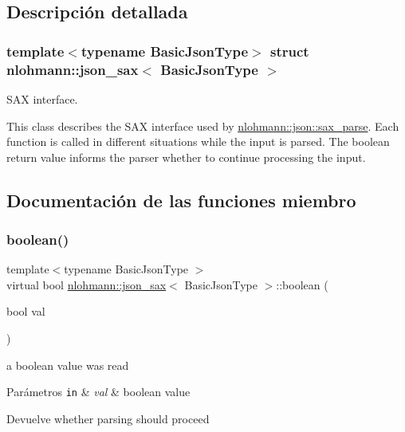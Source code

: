 \subsection{Descripción detallada}
\subsubsection*{template$<$typename Basic\+Json\+Type$>$\newline
struct nlohmann\+::json\+\_\+sax$<$ Basic\+Json\+Type $>$}

S\+AX interface. 

This class describes the S\+AX interface used by \mbox{\hyperlink{classnlohmann_1_1basic__json_a8a3dd150c2d1f0df3502d937de0871db}{nlohmann\+::json\+::sax\+\_\+parse}}. Each function is called in different situations while the input is parsed. The boolean return value informs the parser whether to continue processing the input. 

\subsection{Documentación de las funciones miembro}
\mbox{\label{structnlohmann_1_1json__sax_a82ed080814fa656191a537284bb0c575}} 
\subsubsection{\texorpdfstring{boolean()}{boolean()}}
{\footnotesize\ttfamily template$<$typename Basic\+Json\+Type $>$ \\
virtual bool \mbox{\hyperlink{structnlohmann_1_1json__sax}{nlohmann\+::json\+\_\+sax}}$<$ Basic\+Json\+Type $>$\+::boolean (\begin{DoxyParamCaption}\item[{bool}]{val }\end{DoxyParamCaption})\hspace{0.3cm}{\ttfamily [pure virtual]}}



a boolean value was read 


\begin{DoxyParams}[1]{Parámetros}
\mbox{\tt in}  & {\em val} & boolean value \\
\hline
\end{DoxyParams}
\begin{DoxyReturn}{Devuelve}
whether parsing should proceed 
\end{DoxyReturn}
\mbox{\label{structnlohmann_1_1json__sax_a235ee975617f28e6a996d1e36a282312}} 
